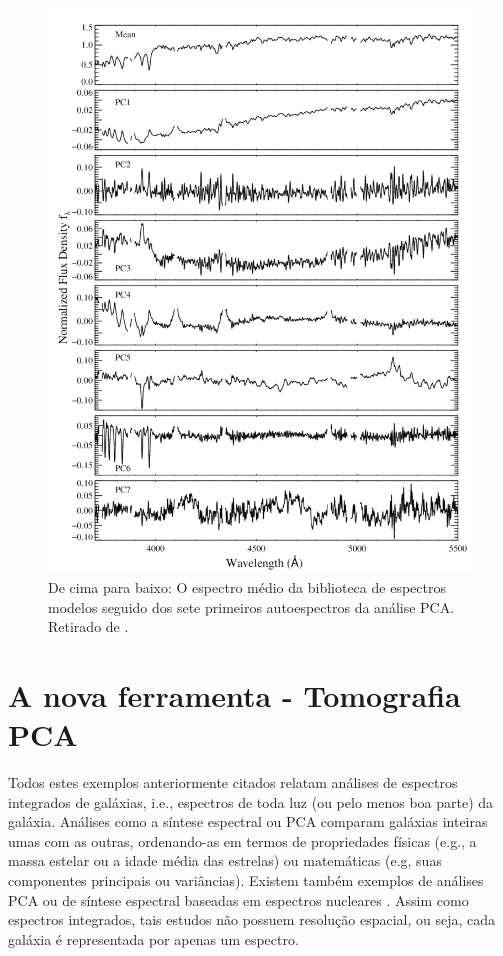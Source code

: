 \begin{figure}
    \includegraphics[height=1.\textwidth]{figuras/figChen2012fig2.pdf}
    \caption[Espectro médio e 7 primeiras PCs de uma biblioteca de modelos.]
    {De cima para baixo: O espectro médio da biblioteca de espectros modelos seguido dos sete primeiros autoespectros
    da análise PCA. Retirado de \citet{Chen2012}.}
    \label{fig:Chen2012fig2}
\end{figure}

\section{A nova ferramenta - Tomografia PCA}
\label{sec:Intro:TomoPCA}

Todos estes exemplos anteriormente citados relatam análises de espectros integrados de galáxias, i.e., espectros de toda
luz (ou pelo menos boa parte) da galáxia. Análises como a síntese espectral ou PCA comparam galáxias inteiras umas com
as outras, ordenando-as em termos de propriedades físicas (e.g., a massa estelar ou a idade média das estrelas) ou
matemáticas (e.g, suas componentes principais ou variâncias). Existem também exemplos de análises PCA ou de síntese
espectral baseadas em espectros nucleares \citep[e.g., ][]{Trager2000I, CidFernandes2004}. Assim como espectros
integrados, tais estudos não possuem resolução espacial, ou seja, cada galáxia é representada por apenas um espectro.

